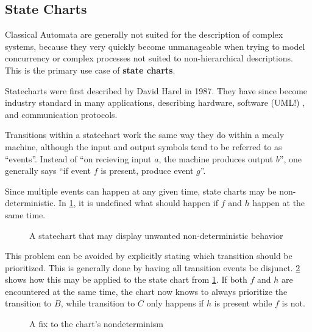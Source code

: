 \documentclass{report}
\newcommand{\tbf}{\textbf}
\newcommand*{\newpar}{\par\vspace{\baselineskip}\noindent} %
\begin{document}
\subsection{State Charts}
Classical Automata are generally not suited for the description of complex systems, because they very quickly become unmanageable when trying to model concurrency or complex processes not suited to non-hierarchical descriptions. This is the primary use case of \tbf{state charts}.
\newpar
Statecharts were first described by David Harel in 1987. They have since become industry standard in many applications, describing hardware, software (UML!) , and communication protocols.
\newpar
Transitions within a statechart work the same way they do within a mealy machine, although the input and output symbols tend to be referred to as ``events''. Instead of ``on recieving input $a$, the machine produces output $b$'', one generally says ``if event $f$ is present, produce event $g$''.
\newpar
Since multiple events can happen at any given time, state charts may be non-deterministic. In \ref{fig:nsc}, it is undefined what should happen if $f$ and $h$ happen at the same time.
\begin{figure}[h!]
\centering
{}
\caption{A statechart that may display unwanted non-deterministic behavior}
\label{fig:nsc}
\end{figure}
\newpar
This problem can be avoided by explicitly stating which transition should be prioritized. This is generally done by having all transition events be disjunct. \ref{fig:dsc} shows how this may be applied to the state chart from \ref{fig:nsc}. If both $f$ and $h$ are encountered at the same time, the chart now knows to always prioritize the transition to $B$, while transition to $C$ only happens if $h$ is present while $f$ is not.
\begin{figure}[h!]
\centering
{}
\label{fig:dsc}
\caption{A fix to the chart's nondeterminism}
\end{figure}
\end{document}
